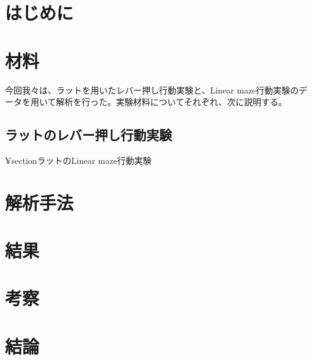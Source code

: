 \chapter{はじめに}
\chapter{材料}
今回我々は、ラットを用いたレバー押し行動実験と、Linear maze行動実験のデータを用いて解析を行った。実験材料についてそれぞれ、次に説明する。
\section{ラットのレバー押し行動実験}

¥section{ラットのLinear maze行動実験}


\chapter{解析手法}
\chapter{結果}
\chapter{考察}
\chapter{結論}
\newpage

